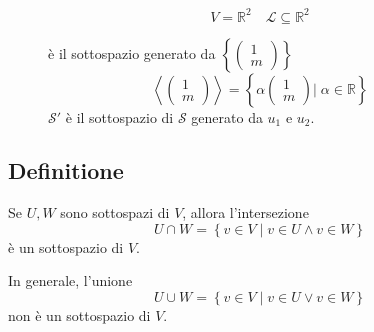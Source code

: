 \documentclass[a4paper]{article}
\theoremstyle{break}
\theoremstyle{break}
\theoremstyle{break}
\theoremstyle{break}
\begin{document}
\begin{figure}[H]
  \begin{example}
    \[
      V = \mathbb{R}^2 \quad \mathcal{L} \subseteq \mathbb{R}^2
    \] 
    \begin{center}
    \end{center}
    \noindent è il sottospazio generato da \(  \left\{ \begin{pmatrix} 1\\m \end{pmatrix}  \right\} \)
    \[
    \left< \begin{pmatrix} 1\\m \end{pmatrix}  \right> = \left\{ \alpha \begin{pmatrix} 1\\m \end{pmatrix} \Big | \; \alpha \in \mathbb{R}  \right\} 
    \] 
    \( \mathcal{S'} \) è il sottospazio di \( \mathcal{S} \) generato da \( u_1 \) e \( u_2 \).
  \end{example}
\end{figure}

\subsection{Definitione}
Se \( U,W \) sono sottospazi di \( V \), allora l'intersezione
\[
  U \cap W = \left\{ v \in V \;|\; v \in U \land v \in W \right\}
\] 
è un sottospazio di \( V \).

\noindent In generale, l'unione
\[
  U \cup W = \left\{ v \in V \;|\; v \in U \lor v \in W \right\}
\] 
non è un sottospazio di \( V \).
\end{document}
